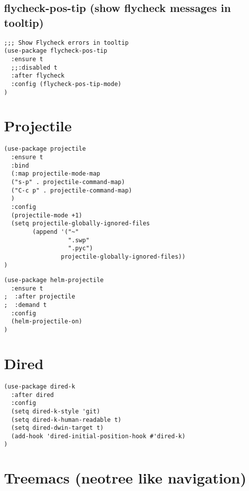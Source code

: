 \documentclass[11pt]{article}
\begin{document}
\subsection*{flycheck-pos-tip (show flycheck messages in tooltip)}
\label{sec:org7eb3235}

\begin{verbatim}
;;; Show Flycheck errors in tooltip
(use-package flycheck-pos-tip
  :ensure t
  ;;:disabled t
  :after flycheck
  :config (flycheck-pos-tip-mode)
)
\end{verbatim}


\section*{Projectile}
\label{sec:org697466b}
\begin{verbatim}
(use-package projectile
  :ensure t
  :bind
  (:map projectile-mode-map
  ("s-p" . projectile-command-map)
  ("C-c p" . projectile-command-map)
  )
  :config
  (projectile-mode +1)
  (setq projectile-globally-ignored-files
        (append '("~"
                  ".swp"
                  ".pyc")
                projectile-globally-ignored-files))
)
\end{verbatim}

\begin{verbatim}
(use-package helm-projectile
  :ensure t
;  :after projectile
;  :demand t
  :config
  (helm-projectile-on)
)
\end{verbatim}


\section*{Dired}
\label{sec:org0435985}

\begin{verbatim}
(use-package dired-k
  :after dired
  :config
  (setq dired-k-style 'git)
  (setq dired-k-human-readable t)
  (setq dired-dwin-target t)
  (add-hook 'dired-initial-position-hook #'dired-k)
)
\end{verbatim}

\section*{Treemacs (neotree like navigation)}
\label{sec:org2ba9217}
\end{document}
